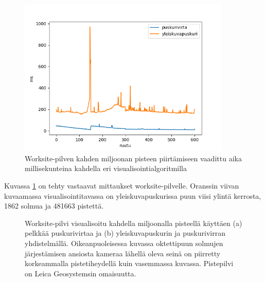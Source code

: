 \begin{figure}[h]
    \centering
    \includegraphics[width=0.9\textwidth]{tuloksia/worksite_ms_per_frame.png}
    \caption{Worksite-pilven kahden miljoonan pisteen piirtämiseen vaadittu aika millisekunteina kahdella eri visualisointialgoritmilla}
    \label{ws_ms}
\end{figure}

Kuvassa \ref{ws_ms} on tehty vastaavat mittaukset worksite-pilvelle. Oranssin viivan kuvaamassa visualisointitavassa on yleiskuvapuskurissa puun viisi ylintä kerrosta, 1862 solmua ja 481663 pistettä.

\begin{figure}
    \caption{Worksite-pilvi visualisoitu kahdella miljoonalla pisteellä käyttäen (a) pelkkää puskurivirtaa ja (b) yleiskuvapuskurin ja puskurivirran yhdistelmällä. Oikeanpuoleisessa kuvassa oktettipuun solmujen järjestämisen ansiosta kameraa lähellä oleva seinä on piirretty korkeammalla pistetiheydellä kuin vasemmassa kuvassa. Pistepilvi on Leica Geosystemsin omaisuutta.}
    \label{img:worksite_vertailu}
\end{figure}

